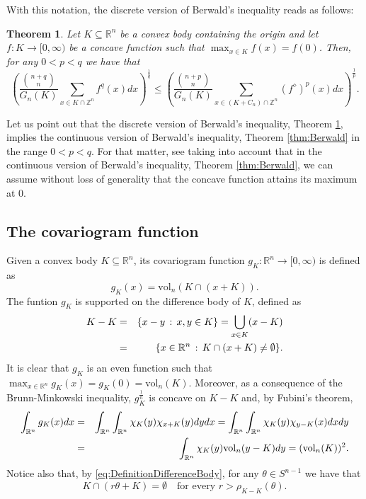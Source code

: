 \documentclass[10pt]{amsart}
\newtheorem{thm}{Theorem}[section]
\def\R{\mathbb{R}}
\def\Z{\mathbb{Z}}
\def\vol{\mathrm{vol}}
\numberwithin{equation}{section}
\begin{document}
With this notation, the discrete version of Berwald's inequality reads as follows:
\begin{thm}\label{thm:BerwaldDiscrete}
Let $K\subseteq\R^n$ be a convex body containing the origin and let $f:K\to[0,\infty)$ be a concave function such that $\displaystyle{\max_{x\in K}f(x)=f(0)}$. Then, for any $0<p<q$ we have that
$$
\left(\frac{{{n+q}\choose{n}}}{G_n(K)}\sum_{x\in K\cap\Z^n} f^q(x)dx\right)^\frac{1}{q}\leq\left(\frac{{{n+p}\choose{n}}}{G_n(K)}\sum_{x\in (K+C_n)\cap\Z^n} (f^\diamond)^p(x)dx\right)^\frac{1}{p}.
$$
\end{thm}

Let us point out that the discrete version of Berwald's inequality, Theorem \ref{thm:BerwaldDiscrete}, implies the continuous version of Berwald's inequality, Theorem \ref{thm:Berwald} in the range $0<p<q$. For that matter, see \cite[Theorem 4.5]{ALY} taking into account that in the continuous version of Berwald's inequality, Theorem \ref{thm:Berwald}, we can assume without loss of generality that the concave function attains its maximum at 0.

\subsection{The covariogram function}\label{subsec:Covariogram}

Given a convex body $K\subseteq\R^n$, its covariogram function $g_K:\R^n\to[0,\infty)$ is defined as
$$
g_K(x)=\vol_n(K\cap(x+K)).
$$
The funtion $g_K$ is supported on the difference body of $K$, defined as
\begin{eqnarray}\label{eq:DefinitionDifferenceBody}
K-K&=&\{x-y\,:\,x,y\in K\}=\bigcup_{x\in K}(x-K)\cr
&=&\{x\in\R^n\,:\, K\cap(x+K)\neq\emptyset\}.
\end{eqnarray}
It is clear that $g_K$ is an even function such that $\displaystyle{\max_{x\in\R^n}g_K(x)=g_K(0)=\vol_n(K)}$. Moreover, as a consequence of the Brunn-Minkowski inequality, $g_K^\frac{1}{n}$ is concave on $K-K$ and, by Fubini's theorem,
\begin{eqnarray}\label{eq:IntegralCovariogram}
\int_{\R^n}g_K(x)dx&=&\int_{\R^n}\int_{\R^n}\chi_K(y)\chi_{x+K}(y)dydx=\int_{\R^n}\int_{\R^n}\chi_K(y)\chi_{y-K}(x)dxdy\cr
&=&\int_{\R^n}\chi_K(y)\vol_n(y-K)dy=(\vol_n(K))^2.
\end{eqnarray}
Notice also that, by \eqref{eq:DefinitionDifferenceBody}, for any $\theta\in S^{n-1}$ we have that
\begin{equation}\label{eq:RadialFunctionDifferenceBody}
K\cap(r\theta+K)=\emptyset\quad\textrm{for every }r>\rho_{K-K}(\theta).
\end{equation}
\end{document}
